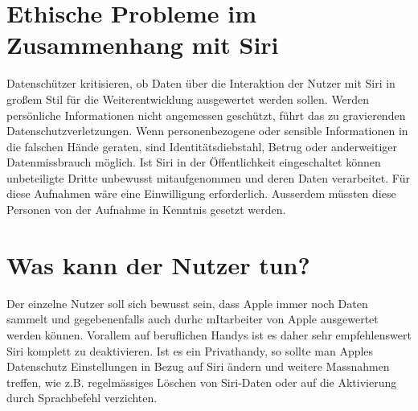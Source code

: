 \documentclass{article}
\begin{document}
\section{Ethische Probleme im Zusammenhang mit Siri}
Datenschützer kritisieren, ob Daten über die Interaktion der Nutzer mit Siri in großem Stil für die Weiterentwicklung ausgewertet werden sollen. Werden persönliche Informationen nicht angemessen geschützt, führt das zu gravierenden Datenschutzverletzungen. Wenn personenbezogene oder sensible Informationen in die falschen Hände geraten, sind Identitätsdiebstahl, Betrug oder anderweitiger Datenmissbrauch möglich. Ist Siri in der Öffentlichkeit eingeschaltet können unbeteiligte Dritte unbewusst mitaufgenommen und deren Daten verarbeitet.
Für diese Aufnahmen wäre eine Einwilligung erforderlich. Ausserdem müssten diese Personen von der Aufnahme in Kenntnis gesetzt werden.

\section{Was kann der Nutzer tun?}
Der einzelne Nutzer soll sich bewusst sein, dass Apple immer noch Daten sammelt und gegebenenfalls auch durhc mItarbeiter von Apple ausgewertet werden können. Vorallem auf beruflichen Handys ist es daher sehr empfehlenswert Siri komplett zu deaktivieren. Ist es ein Privathandy, so sollte man Apples Datenschutz Einstellungen in Bezug auf Siri ändern und weitere Massnahmen treffen, wie z.B. regelmässiges Löschen von Siri-Daten oder auf die Aktivierung durch Sprachbefehl verzichten. 


\printbibliography
\end{document}
